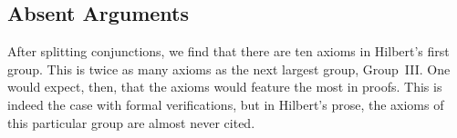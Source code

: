 
\subsection{Absent Arguments}
After splitting conjunctions, we find that there are ten axioms in Hilbert's first group. This is twice as many axioms as the next largest group, Group~III. One would expect, then, that the axioms would feature the most in proofs. This is indeed the case with formal verifications, but in Hilbert's prose, the axioms of this particular group are almost never cited.

